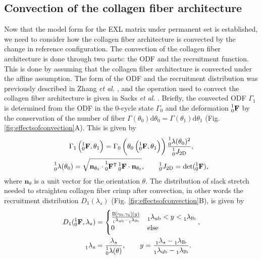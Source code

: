 \subsection{Convection of the collagen fiber architecture} \label{sec:convection}

    Now that the model form for the EXL matrix under permanent set is established, we need to consider how the collagen fiber architecture is convected by the change in reference configuration. The convection of the collagen fiber architecture is done through two parts: the ODF and the recruitment function. This is done by assuming that the collagen fiber architecture is convected under the affine assumption\cite{lee_presence_2015}. The form of the ODF and the recruitment distribution was previously described in Zhang \textit{et al.} \cite{zhang_meso_2016}, and the operation used to convect the collagen fiber architecture is given in Sacks \textit{et al}. \cite{sacks_novel_2016}. Briefly, the convected ODF $\Gamma_1$ is determined from the ODF in the 0-cycle state $\Gamma_0$ and the deformation $\prescript{1}{0}{\mathbf{F}}$ by the conservation of the number of fiber $\Gamma(\theta_0) \mathrm{d}\theta_0 = \Gamma(\theta_1) \mathrm{d}\theta_1$ (Fig. \ref{fig:effectsofconvection}A). This is given by
\begin{equation} \label{eq:pfODF}
\begin{gathered}
\Gamma_1\left( \prescript{1}{0}{\mathbf{F}},\theta_1 \right) = \Gamma_0\left( \theta_0\left( \prescript{1}{0}{\mathbf{F}},\theta_1\right)\right)\frac{\prescript{1}{0}{\lambda(\theta_0)}^2}{\prescript{1}{0}{J_\mathrm{2D}}}, \\
\prescript{1}{0}{\lambda(\theta_0)} = \sqrt{\mathbf{n}_{\theta_0}\cdot  \prescript{1}{0}{\mathbf{F}^\mathsf{T}}  \prescript{1}{0}{\mathbf{F}} \cdot \mathbf{n}_{\theta_0}}, \qquad \prescript{1}{0}{J_\mathrm{2D}} =\det (\prescript{1}{0}{\mathbf{F}}),
\end{gathered}
\end{equation}
    where $\mathbf{n}_\theta$ is a unit vector for the orientation $\theta$. The distribution of slack stretch needed to straighten collagen fiber crimp after convection, in other words the recruitment distribution $D_1(\lambda_s)$ (Fig. \ref{fig:effectsofconvection}B), is given by
\begin{equation} \label{eq:pfrecruitment}
\begin{gathered}
D_1(\prescript{1}{0}{\mathbf{F}}, \lambda_s) = \begin{cases} \frac{\operatorname{B}[\gamma_0,\gamma_1](y)}{\prescript{}{1}{\lambda}_\mathrm{ub}-\prescript{}{1}{\lambda}_\mathrm{lb}} & \prescript{}{1}{\lambda}_\mathrm{ub} < y < \prescript{}{1}{\lambda}_\mathrm{lb} \\ 0 & \text{else}\end{cases}, \\
\qquad \prescript{}{1}{\lambda}_s = \frac{\lambda_s}{\prescript{1}{0}{\lambda}(\theta)}, \qquad y = \frac{\prescript{}{1}{\lambda}_s - \prescript{}{1}{\lambda}_\mathrm{lb}}{\prescript{}{1}{\lambda}_\mathrm{ub}-\prescript{}{1}{\lambda}_\mathrm{lb}}.
\end{gathered}
\end{equation}
